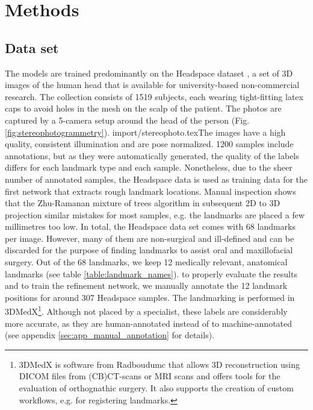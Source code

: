 \documentclass[class=article, crop=false]{standalone}
\begin{document}
\section{Methods}
\label{sec:methods}

\subsection{Data set}\label{sec:data_preparation}The models are trained predominantly on the Headspace dataset \cite{Dai2019}, a set of 3D images of the human head that is available for university-based non-commercial research. The collection consists of 1519 subjects, each wearing tight-fitting latex caps to avoid holes in the mesh on the scalp of the patient. The photos are captured by a 5-camera setup around the head of the person (Fig. \ref{fig:stereophotogrammetry}).
{import/stereophoto.tex}The images have a high quality, consistent illumination and are pose normalized. 1200 samples include annotations, but as they were automatically generated, the quality of the labels differs for each landmark type and each sample. Nonetheless, due to the sheer number of annotated samples, the Headspace data is used as training data for the first network that extracts rough landmark locations. Manual inspection shows that the Zhu-Ramanan mixture of trees algorithm in subsequent 2D to 3D projection similar mistakes for most samples, e.g. the landmarks are placed a few millimetres too low. %
In total, the Headspace data set comes with 68 landmarks per image. However, many of them are non-surgical and ill-defined and can be discarded for the purpose of finding landmarks to assist oral and maxillofacial surgery. Out of the 68 landmarks, we keep 12 medically relevant, anatomical landmarks (see table \ref{table:landmark_names}). to properly evaluate the results and to train the refinement network, we manually annotate the 12 landmark positions for around 307 Headspace samples. The landmarking is performed in 3DMedX\footnote{3DMedX is software from Radboudumc that allows 3D reconstruction using DICOM files from (CB)CT-scans or MRI scans and offers tools for the evaluation of orthognathic surgery. It also supports the creation of custom workflows, e.g. for registering landmarks.}\cite{3dmedx}. Although not placed by a specialist, these labels are considerably more accurate, as they are human-annotated instead of to machine-annotated (see appendix \ref{sec:app_manual_annotation} for details).
\end{document}
